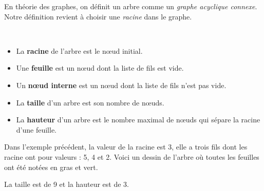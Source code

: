 \documentclass{../cours}
\begin{document}
\begin{Remark}
En théorie des graphes, on définit un arbre comme un \emph{graphe acyclique connexe}. Notre définition revient à choisir une \emph{racine} dans le graphe.
\end{Remark}

\begin{Definition}

~
\begin{itemize}
\item La \textbf{racine} de l'arbre est le nœud initial.
\item Une \textbf{feuille} est un nœud dont la liste de fils est vide.
\item Un \textbf{nœud interne} est un nœud dont la liste de fils n'est pas vide.
\item La \textbf{taille} d'un arbre est son nombre de nœuds.
\item La \textbf{hauteur} d'un arbre est le nombre maximal de nœuds qui sépare la racine d'une feuille.  
\end{itemize}
\end{Definition}

\begin{Example}
Dans l'exemple précédent, la valeur de la racine est 3, elle a trois fils dont les racine ont pour valeurs : 5, 4 et 2. Voici un dessin de l'arbre où toutes les feuilles ont été notées en gras et vert.

{ \newcommand{\nodea}{\node[draw,circle] (a) {$3$}
;}\newcommand{\nodeb}{\node[draw,circle] (b) {$5$}
;}\newcommand{\nodec}{\node[draw,circle, ultra thick, green, font=\bf] (c) {$2$}
;}\newcommand{\noded}{\node[draw,circle, ultra thick, green, font=\bf] (d) {$3$}
;}\newcommand{\nodee}{\node[draw,circle, ultra thick, green, font=\bf] (e) {$4$}
;}\newcommand{\nodef}{\node[draw,circle] (f) {$2$}
;}\newcommand{\nodeg}{\node[draw,circle, ultra thick, green, font=\bf] (g) {$7$}
;}\newcommand{\nodeh}{\node[draw,circle, ultra thick, green, font=\bf] (h) {$1$}
;}\newcommand{\nodei}{\node[draw,circle, ultra thick, green, font=\bf] (i) {$9$}
;}}

La taille est de 9 et la hauteur est de 3.

\end{Example}
\end{document}
